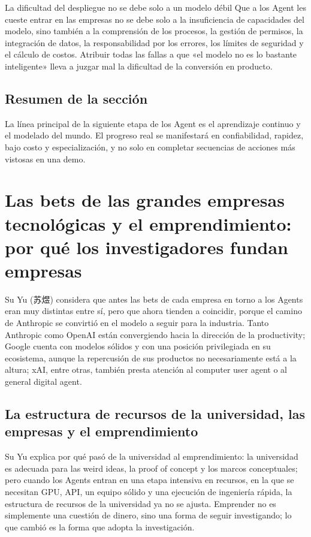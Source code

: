 \documentclass[a4paper]{article}
\begin{document}
\begin{warningbox}{La dificultad del despliegue no se debe solo a un modelo débil}
Que a los Agent les cueste entrar en las empresas no se debe solo a la insuficiencia de capacidades del modelo, sino también a la comprensión de los procesos, la gestión de permisos, la integración de datos, la responsabilidad por los errores, los límites de seguridad y el cálculo de costos. Atribuir todas las fallas a que «el modelo no es lo bastante inteligente» lleva a juzgar mal la dificultad de la conversión en producto.
\end{warningbox}

\subsection{Resumen de la sección}

La línea principal de la siguiente etapa de los Agent es el aprendizaje continuo y el modelado del mundo. El progreso real se manifestará en confiabilidad, rapidez, bajo costo y especialización, y no solo en completar secuencias de acciones más vistosas en una demo.
\section{Las bets de las grandes empresas tecnológicas y el emprendimiento: por qué los investigadores fundan empresas}

Su Yu (苏煜) considera que antes las bets de cada empresa en torno a los Agents eran muy distintas entre sí, pero que ahora tienden a coincidir, porque el camino de Anthropic se convirtió en el modelo a seguir para la industria. Tanto Anthropic como OpenAI están convergiendo hacia la dirección de la productivity; Google cuenta con modelos sólidos y con una posición privilegiada en su ecosistema, aunque la repercusión de sus productos no necesariamente está a la altura; xAI, entre otras, también presta atención al computer user agent o al general digital agent.




\subsection{La estructura de recursos de la universidad, las empresas y el emprendimiento}

Su Yu explica por qué pasó de la universidad al emprendimiento: la universidad es adecuada para las weird ideas, la proof of concept y los marcos conceptuales; pero cuando los Agents entran en una etapa intensiva en recursos, en la que se necesitan GPU, API, un equipo sólido y una ejecución de ingeniería rápida, la estructura de recursos de la universidad ya no se ajusta. Emprender no es simplemente una cuestión de dinero, sino una forma de seguir investigando; lo que cambió es la forma que adopta la investigación.
\end{document}

